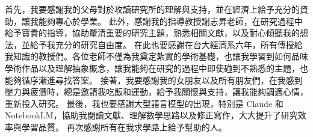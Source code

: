 
\begin{acknowledgement}
首先，我要感謝我的父母對於攻讀研究所的理解與支持，並在經濟上給予充分的資助，讓我能夠專心於學業。
此外，感謝我的指導教授謝志昇老師，在研究過程中給予寶貴的指導，協助釐清重要的研究主題，熟悉相關文獻，以及耐心傾聽我的想法，並給予我充分的研究自由度。
在此也要感謝在台大經濟系六年，所有傳授給我知識的教授們。各位老師不僅為我奠定紮實的學術基礎，也讓我學習到如何品味學術作品以及理解抽象概念，讓我能夠在研究的過程中即使碰到不熟悉的主題，也能夠循序漸進尋找答案。
接著，我要感謝我的女朋友以及所有朋友們，在我感到壓力與疲憊時，總是邀請我吃飯和運動，給予我關懷與支持，讓我能夠調適心情，重新投入研究。
最後，我也要感謝大型語言模型的出現，特別是 Claude 和 NotebookLM，協助我閱讀文獻、理解數學思路以及修正寫作，大大提升了研究效率與學習品質。
再次感謝所有在我求學路上給予幫助的人。
\end{acknowledgement}
